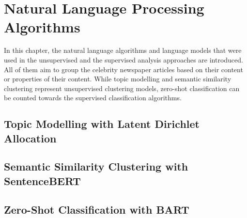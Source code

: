\renewcommand{\imagepath}{../30-algorithms/img}

\chapter{Natural Language Processing Algorithms}
In this chapter, the natural language algorithms and language models that were used in the unsupervised and the supervised analysis approaches are introduced. All of them aim to group the celebrity newspaper articles based on their content or properties of their content. While topic modelling and semantic similarity clustering represent unsupervised clustering models, zero-shot classification can be counted towards the supervised classification algorithms.

\section{Topic Modelling with Latent Dirichlet Allocation}\label{ch:lda}
\section{Semantic Similarity Clustering with SentenceBERT}
\section{Zero-Shot Classification with BART}